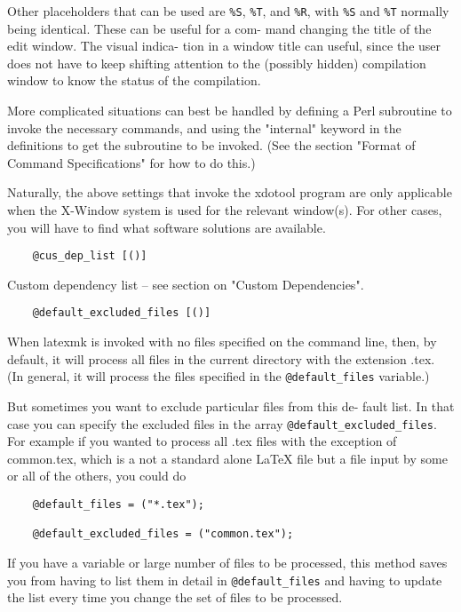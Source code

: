 Other placeholders that can be used are \verb|%S|, \verb|%T|, and \verb|%R|, with  \verb|%S|
and  \verb|%T| normally being identical. These can be useful for a com-
mand changing the title of the edit window. The  visual  indica-
tion  in a window title can useful, since the user does not have
to keep shifting attention to the (possibly hidden)  compilation
window to know the status of the compilation.

More  complicated  situations  can best be handled by defining a
Perl subroutine to invoke the necessary commands, and using  the
"internal"  keyword  in the definitions to get the subroutine to
be invoked.  (See the section "Format of Command Specifications"
for how to do this.)

Naturally,  the  above  settings that invoke the xdotool program
are only applicable when the X-Window system  is  used  for  the
relevant window(s).  For other cases, you will have to find what
software solutions are available.


\begin{verbatim}
	@cus_dep_list [()]
\end{verbatim}

Custom dependency list -- see section on "Custom Dependencies".

\begin{verbatim}
	@default_excluded_files [()]
\end{verbatim}

When latexmk is invoked with no files specified on  the  command
line, then, by default, it will process all files in the current
directory with the extension .tex.  (In general, it will process
the files specified in the \verb|@default_files| variable.)

But sometimes you want to exclude particular files from this de-
fault list.  In that case you can specify the excluded files  in
the array \verb|@default_excluded_files|.  For example if you wanted to
process all .tex files with the exception of  common.tex,  which
is a not a standard alone LaTeX file but a file input by some or
all of the others, you could do

\begin{verbatim}
	@default_files = ("*.tex");
	
	@default_excluded_files = ("common.tex");
\end{verbatim}

If you have a variable or large number of files to be processed,
this method saves you from having to list them in detail in 
\verb|@default_files| and having to update the list every time you  change
the set of files to be processed.


